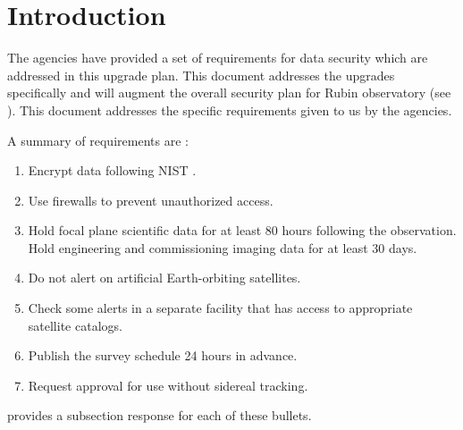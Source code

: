 \section{Introduction}

The agencies have provided a set of requirements for data security which are addressed in this upgrade plan.  This document addresses the upgrades specifically and will augment the overall security plan for Rubin observatory (see ).
This document addresses the specific requirements given to us by the agencies.

A summary of requirements are :
\begin{enumerate}

\item	Encrypt data following NIST .
\item	Use firewalls to prevent unauthorized  access.
\item	Hold focal plane scientific data for at least 80 hours following the observation. Hold engineering and commissioning imaging data for at least 30 days.
\item	Do not alert on artificial Earth-orbiting satellites.
\item	Check some alerts in a separate facility that has access to appropriate satellite catalogs.
\item	Publish the survey schedule 24 hours in advance.
\item	Request approval for use  without sidereal tracking.

\end{enumerate}


 provides a subsection response for each of these bullets.

